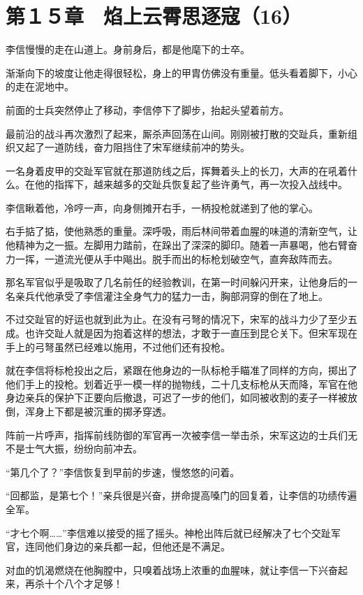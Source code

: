 \section{第１５章　焰上云霄思逐寇（16）}

李信慢慢的走在山道上。身前身后，都是他麾下的士卒。

渐渐向下的坡度让他走得很轻松，身上的甲胄仿佛没有重量。低头看着脚下，小心的走在泥地中。

前面的士兵突然停止了移动，李信停下了脚步，抬起头望着前方。

最前沿的战斗再次激烈了起来，厮杀声回荡在山间。刚刚被打散的交趾兵，重新组织又起了一道防线，奋力阻挡住了宋军继续前冲的势头。

一名身着皮甲的交趾军官就在那道防线之后，挥舞着头上的长刀，大声的在吼着什么。在他的指挥下，越来越多的交趾兵恢复起了些许勇气，再一次投入战线中。

李信瞅着他，冷哼一声，向身侧摊开右手，一柄投枪就递到了他的掌心。

右手掂了掂，使他熟悉的重量。深呼吸，雨后林间带着血腥的味道的清新空气，让他精神为之一振。左脚用力踏前，在跺出了深深的脚印。随着一声暴喝，他右臂奋力一挥，一道流光便从手中飚出。脱手而出的标枪划破空气，直奔敌阵而去。

那名军官似乎是吸取了几名前任的经验教训，在第一时间躲闪开来，让他身后的一名亲兵代他承受了李信灌注全身气力的猛力一击，胸部洞穿的倒在了地上。

不过交趾官的好运也就到此为止。在没有弓弩的情况下，宋军的战斗力少了至少五成。也许交趾人就是因为抱着这样的想法，才敢于一直压到昆仑关下。但宋军现在手上的弓弩虽然已经难以施用，不过他们还有投枪。

就在李信将标枪投出之后，紧跟在他身边的一队标枪手瞄准了同样的方向，掷出了他们手上的投枪。划着近乎一模一样的抛物线，二十几支标枪从天而降，军官在他身边亲兵的保护下正要向后撤退，可迟了一步的他们，如同被收割的麦子一样被放倒，浑身上下都是被沉重的掷矛穿透。

阵前一片呼声，指挥前线防御的军官再一次被李信一举击杀，宋军这边的士兵们无不是士气大振，纷纷向前冲去。

“第几个了？”李信恢复到早前的步速，慢悠悠的问着。

“回都监，是第七个！”亲兵很是兴奋，拼命提高嗓门的回复着，让李信的功绩传遍全军。

“才七个啊……”李信难以接受的摇了摇头。神枪出阵后就已经解决了七个交趾军官，连同他们身边的亲兵都一起，但他还是不满足。

对血的饥渴燃烧在他胸膛中，只嗅着战场上浓重的血腥味，就让李信一下兴奋起来，再杀十个八个才足够！

